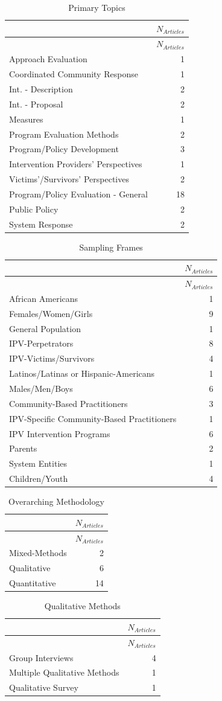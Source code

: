 \documentclass[]{tufte-handout}
\begin{document}
\begin{longtable}[]{@{}lr@{}}
\caption{Primary Topics}\tabularnewline
\toprule
& \(N_{Articles}\)\tabularnewline
\midrule
\endfirsthead
\toprule
& \(N_{Articles}\)\tabularnewline
\midrule
\endhead
Approach Evaluation & 1\tabularnewline
Coordinated Community Response & 1\tabularnewline
Int. - Description & 2\tabularnewline
Int. - Proposal & 2\tabularnewline
Measures & 1\tabularnewline
Program Evaluation Methods & 2\tabularnewline
Program/Policy Development & 3\tabularnewline
Intervention Providers' Perspectives & 1\tabularnewline
Victims'/Survivors' Perspectives & 2\tabularnewline
Program/Policy Evaluation - General & 18\tabularnewline
Public Policy & 2\tabularnewline
System Response & 2\tabularnewline
\bottomrule
\end{longtable}

\begin{longtable}[]{@{}lr@{}}
\caption{Sampling Frames}\tabularnewline
\toprule
& \(N_{Articles}\)\tabularnewline
\midrule
\endfirsthead
\toprule
& \(N_{Articles}\)\tabularnewline
\midrule
\endhead
African Americans & 1\tabularnewline
Females/Women/Girls & 9\tabularnewline
General Population & 1\tabularnewline
IPV-Perpetrators & 8\tabularnewline
IPV-Victims/Survivors & 4\tabularnewline
Latinos/Latinas or Hispanic-Americans & 1\tabularnewline
Males/Men/Boys & 6\tabularnewline
Community-Based Practitioners & 3\tabularnewline
IPV-Specific Community-Based Practitioners & 1\tabularnewline
IPV Intervention Programs & 6\tabularnewline
Parents & 2\tabularnewline
System Entities & 1\tabularnewline
Children/Youth & 4\tabularnewline
\bottomrule
\end{longtable}

\begin{longtable}[]{@{}lr@{}}
\caption{Overarching Methodology}\tabularnewline
\toprule
& \(N_{Articles}\)\tabularnewline
\midrule
\endfirsthead
\toprule
& \(N_{Articles}\)\tabularnewline
\midrule
\endhead
Mixed-Methods & 2\tabularnewline
Qualitative & 6\tabularnewline
Quantitative & 14\tabularnewline
\bottomrule
\end{longtable}

\begin{longtable}[]{@{}lr@{}}
\caption{Qualitative Methods}\tabularnewline
\toprule
& \(N_{Articles}\)\tabularnewline
\midrule
\endfirsthead
\toprule
& \(N_{Articles}\)\tabularnewline
\midrule
\endhead
Group Interviews & 4\tabularnewline
Multiple Qualitative Methods & 1\tabularnewline
Qualitative Survey & 1\tabularnewline
\bottomrule
\end{longtable}
\end{document}
